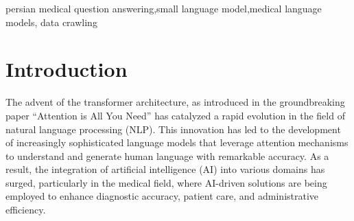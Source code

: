 \documentclass[conference]{IEEEtran}
\begin{document}
	\begin{abstract}
The rapid advancement of language models has demonstrated the potential of artificial intelligence in the healthcare industry. However, small language models struggle with specialized domains in low-resource languages like Persian. While numerous medical-domain websites exist in Persian, no curated dataset or corpus has been available—making ours the first of its kind. This study introduces a newly curated dataset comprising 20k doctor-patient Q\&A pairs and 60\% of a 90-million-token crawled corpus from medical magazines. Using a parameter-efficient fine-tuning approach, we enhanced the medical knowledge of the baseline model, aya-expanse-8b. Benchmark evaluations demonstrate that the fine-tuned model achieves improved accuracy in medical question answering and successfully passed the Iranian Basic Medical Science Entrance Exam (IBSEE) in September 2023, which the baseline model did not. Additionally, the fine-tuned model improved Persian-translated MMLU accuracy by an average of 2.67\%. This work highlights the potential of leveraging open-access online data to enrich small language models in medical fields, providing a novel solution for Persian medical AI applications suitable for resource-constrained environments. Future research could explore multimodal input to further enhance performance.
	\end{abstract}
	
	\begin{IEEEkeywords}
		persian medical question answering,small language model,medical language models, data crawling
	\end{IEEEkeywords}
	
	\section{Introduction}
	The advent of the transformer architecture, as introduced in the groundbreaking paper “Attention is All You Need”
	\cite{b1}
	has catalyzed a rapid evolution in the field of natural language processing (NLP). This innovation has led to the development of increasingly sophisticated language models that leverage attention mechanisms to understand and generate human language with remarkable accuracy. As a result, the integration of artificial intelligence (AI) into various domains has surged, particularly in the medical field, where AI-driven solutions are being employed to enhance diagnostic accuracy, patient care, and administrative efficiency.
	
\end{document}
